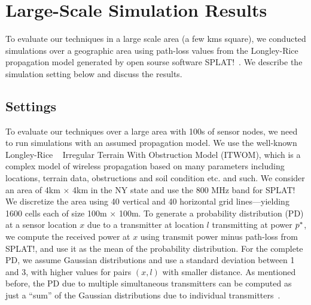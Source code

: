 \section{Large-Scale Simulation Results}
\label{sec:eval}

To evaluate our techniques in a large scale area (a few kms square),
we conducted simulations over a geographic area using path-loss values
from the Longley-Rice propagation model generated by
open sourse software SPLAT!~\cite{splat}. We describe the simulation setting below and
discuss the results.

\subsection{Settings}

 To evaluate our
techniques over a large area with 100s of sensor nodes, we need to run
simulations with an assumed propagation model. We use the well-known
Longley-Rice ~\cite{chamberlin82} Irregular Terrain With Obstruction Model (ITWOM), 
which is a complex model of wireless
propagation based on many parameters including locations, terrain
data, obstructions and soil condition etc. and such.
We consider an area of 4km $\times$ 4km in the NY state and use the
800 MHz band for SPLAT! We discretize the area using 40 vertical and
40 horizontal grid lines---yielding 1600 cells each of size 100m
$\times$ 100m.
To generate a probability distribution (PD) at a sensor location $x$
due to a transmitter at location $l$ transmitting at power $p^*$,
we compute the received power at $x$ using transmit power minus path-loss from SPLAT!, and use it as the mean of the probability distribution. For the
complete PD, we assume Gaussian distributions and use a standard
deviation between 1 and 3, with higher values for pairs $(x,l)$ with
smaller distance.
As mentioned before, the PD due to multiple simultaneous transmitters
can be computed as just a ``sum'' of the Gaussian distributions due to
individual transmitters~\cite{rappaport-2001,mobicom17-splot}.

